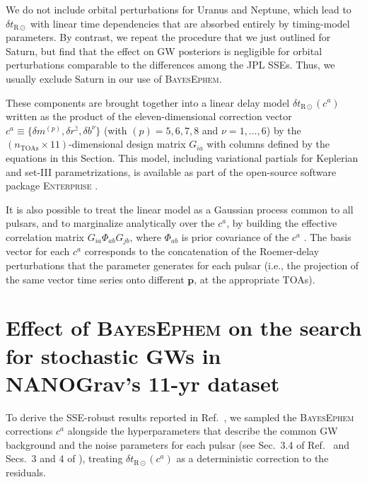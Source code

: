 \documentclass[reprint,
 amsmath,amssymb,
 aps,prd,floatfix,
]{revtex4-1}
\begin{document}
\begin{itemize}[leftmargin=*]
We do not include orbital perturbations for Uranus and Neptune, which lead to $\delta t_{\mathrm{R\odot}}$ with linear time dependencies that are absorbed entirely by timing-model parameters. By contrast, we repeat the procedure that we just outlined for Saturn, but find that the effect on GW posteriors is negligible for orbital perturbations comparable to the differences among the JPL SSEs. Thus, we usually exclude Saturn in our use of \textsc{BayesEphem}. 
\end{itemize}

These components are brought together into a linear delay model $\delta t_{\mathrm{R}\odot}(c^a)$ written as the product of the eleven-dimensional correction vector $c^a \equiv \{\delta m^{(p)}, \delta r^{\hat{z}}, \delta b^\nu\}$ (with $(p) = 5,6,7,8$ and $\nu = 1, \ldots, 6$) by the $(n_\mathrm{TOAs} \times 11)$-dimensional design matrix $G_{i a}$ with columns defined by the equations in this Section. This model, including variational partials for Keplerian and set-III parametrizations, is available as part of the open-source software package \textsc{Enterprise} \cite{enterprise}.

It is also possible to treat the linear model as a Gaussian process common to all pulsars, and to marginalize analytically over the $c^a$, by building the effective correlation matrix $G_{i a} \Phi_{ab} G_{j b}$, where $\Phi_{ab}$ is prior covariance of the $c^a$ \cite{vhv14}. The basis vector for each $c^a$ corresponds to the concatenation of the Roemer-delay perturbations that the parameter generates for each pulsar (i.e., the projection of the same vector time series onto different $\mathbf{p}$, at the appropriate TOAs).

\section{Effect of \textsc{BayesEphem} on the search for stochastic GWs in NANOGrav's 11-yr dataset}
\label{sec:results}

To derive the SSE-robust results reported in Ref.\ \cite{2018ApJ...859...47A}, we sampled the \textsc{BayesEphem} corrections $c^a$ alongside the hyperparameters that describe the common GW background and the noise parameters for each pulsar (see Sec.\ 3.4 of Ref.\ \cite{2018ApJ...859...47A} and Secs.\ 3 and 4 of \cite{2016ApJ...821...13A}), treating $\delta t_{\mathrm{R}\odot}(c^a)$ as a deterministic correction to the residuals.
\end{document}
